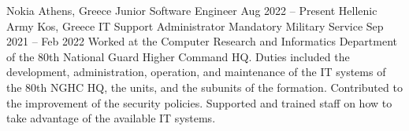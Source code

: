 
\begin{cventries}
    \cventryiv
        {Nokia}
        {Athens, Greece}
        {Junior Software Engineer}
        {Aug 2022 -- Present}
    \cventryiv
        {Hellenic Army}
        {Kos, Greece}
        {IT Support Administrator \cvseparator Mandatory Military Service}
        {Sep 2021 -- Feb 2022}
    \cventryi
        {Worked at the Computer Research and Informatics Department of the 80th National Guard Higher Command HQ. Duties included the development, administration, operation, and maintenance of the IT systems of the 80th NGHC HQ, the units, and the subunits of the formation. Contributed to the improvement of the security policies. Supported and trained staff on how to take advantage of the available IT systems.}
\end{cventries}
